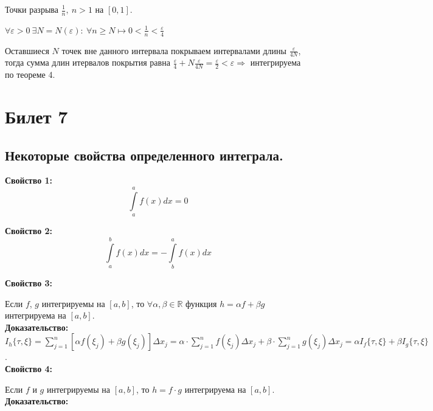 \documentclass[a4paper,12pt]{article} %
\renewcommand {\geq}{\geqslant}
\begin{document}
	Точки разрыва $\frac{1}{n},~n>1$ на $[0,1]$.
	
	$\forall\varepsilon>0~\exists N=N(\varepsilon):~\forall n\geq N\longmapsto 0<\frac{1}{n}<\frac{\varepsilon}{4}$
	
	Оставшиеся $N$ точек вне данного интервала покрываем интервалами длины $\frac{\varepsilon}{4N}$, тогда сумма длин итервалов покрытия равна $\frac{\varepsilon}{4}+N\frac{\varepsilon}{4N}=\frac{\varepsilon}{2}<\varepsilon\Rightarrow$ интегрируема по теореме 4.
	
	
	
	\section{Билет 7}
	
	\subsection{Некоторые свойства определенного интеграла.}
	
	\textbf{Свойство 1:}
	$$\int \limits_a^a f(x)dx = 0$$
	
	\textbf{Свойство 2:}
	$$\int \limits_a^b f(x)dx = -\int \limits_b^a f(x)dx$$
	
	\textbf{Свойство 3:}
	
	Если $ f $, $ g $ интегрируемы на $ [a, b] $, то $\forall{\alpha, \beta} \in \mathbb{R} $ функция $ h = \alpha f + \beta g $ интегрируема на $ [a, b] $.\\
	
	\textbf{Доказательство:} \\[5 mm]
	$ I_h \{ \tau, \xi \} = \sum\limits_{j = 1}^n   [\alpha f(\xi_j) + \beta g(\xi_j)] \Delta x_j  =  \alpha \cdot \sum\limits_{j = 1}^n f(\xi_j)\Delta x_j + \beta \cdot \sum\limits_{j = 1}^n g(\xi_j)\Delta x_j = \alpha I_f \{\tau, \xi \} + \beta I_g \{\tau, \xi \} $.\\
	
	\textbf{Свойство 4:}
	
	Если $ f $ и $ g $ интегрируемы на $ [a, b] $, то $ h = f \cdot g $ интегрируема на $ [a, b] $.\\
	
	\textbf{Доказательство:}
	
\end{document}
